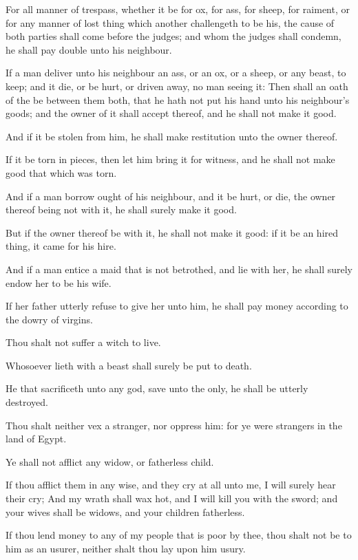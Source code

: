 \Verse For all manner of trespass, whether it be for ox, for ass, for sheep, for raiment, or for any manner of lost thing which another challengeth to be his, the cause of both parties shall come before the judges; and whom the judges shall condemn, he shall pay double unto his neighbour.

\Verse If a man deliver unto his neighbour an ass, or an ox, or a sheep, or any beast, to keep; and it die, or be hurt, or driven away, no man seeing it: \Verse Then shall an oath of the \LORD be between them both, that he hath not put his hand unto his neighbour's goods; and the owner of it shall accept thereof, and he shall not make it good.

\Verse And if it be stolen from him, he shall make restitution unto the owner thereof.

\Verse If it be torn in pieces, then let him bring it for witness, and he shall not make good that which was torn.

\Verse And if a man borrow ought of his neighbour, and it be hurt, or die, the owner thereof being not with it, he shall surely make it good.

\Verse But if the owner thereof be with it, he shall not make it good: if it be an hired thing, it came for his hire.

\Verse And if a man entice a maid that is not betrothed, and lie with her, he shall surely endow her to be his wife.

\Verse If her father utterly refuse to give her unto him, he shall pay money according to the dowry of virgins.

\Verse Thou shalt not suffer a witch to live.

\Verse Whosoever lieth with a beast shall surely be put to death.

\Verse He that sacrificeth unto any god, save unto the \LORD only, he shall be utterly destroyed.

\Verse Thou shalt neither vex a stranger, nor oppress him: for ye were strangers in the land of Egypt.

\Verse Ye shall not afflict any widow, or fatherless child.

\Verse If thou afflict them in any wise, and they cry at all unto me, I will surely hear their cry; \Verse And my wrath shall wax hot, and I will kill you with the sword; and your wives shall be widows, and your children fatherless.

\Verse If thou lend money to any of my people that is poor by thee, thou shalt not be to him as an usurer, neither shalt thou lay upon him usury.

